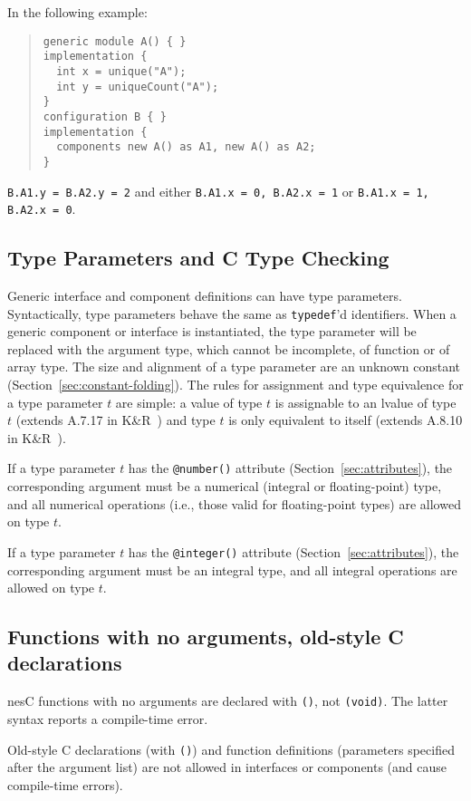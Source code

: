 \documentclass[11pt,letterpaper]{article}
\newcommand{\kw}[1]{{\tt #1}}
\newcommand{\code}[1]{{\tt #1}}
\newcommand{\nesc}{nesC\xspace}
\begin{document}
In the following example:
\begin{quote}
\begin{verbatim}
generic module A() { }
implementation {
  int x = unique("A");
  int y = uniqueCount("A");
}
configuration B { }
implementation {
  components new A() as A1, new A() as A2;
}
\end{verbatim}
\end{quote}
\code{B.A1.y = B.A2.y = 2} and either \code{B.A1.x = 0, B.A2.x = 1} or
\code{B.A1.x = 1, B.A2.x = 0}.

\subsection{Type Parameters and C Type Checking}
\label{sec:type-parameters}

Generic interface and component definitions can have type
parameters. Syntactically, type parameters behave the same as \kw{typedef}'d
identifiers. When a generic component or interface is instantiated, the
type parameter will be replaced with the argument type, which cannot be
incomplete, of function or of array type. The size and alignment of a type
parameter are an unknown constant (Section~\ref{sec:constant-folding}).
The rules for assignment and type equivalence for a type parameter $t$ are
simple: a value of type $t$ is assignable to an lvalue of type $t$ (extends
A.7.17 in K\&R~\cite{kandr}) and type $t$ is only equivalent to itself (extends
A.8.10 in K\&R~\cite{kandr}).

If a type parameter $t$ has the \code{@number()} attribute
(Section~\ref{sec:attributes}), the corresponding argument must be a
numerical (integral or floating-point) type, and all numerical operations
(i.e., those valid for floating-point types) are allowed on type $t$.

If a type parameter $t$ has the \code{@integer()} attribute
(Section~\ref{sec:attributes}), the corresponding argument must be an
integral type, and all integral operations are allowed on type $t$.

\subsection{Functions with no arguments, old-style C declarations}
\label{sec:misc-void}

\nesc functions with no arguments are declared with \code{()}, not
\code{(void)}. The latter syntax reports a compile-time error.

Old-style C declarations (with \code{()}) and function definitions 
(parameters specified after the argument list) are not allowed in
interfaces or components (and cause compile-time errors).
\end{document}
